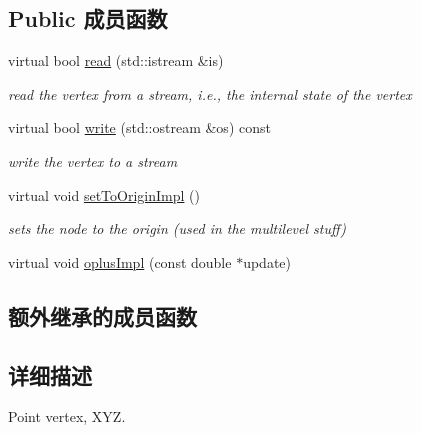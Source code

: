 \subsection*{Public 成员函数}
\begin{DoxyCompactItemize}
\item 
\hypertarget{classg2o_1_1VertexSBAPointXYZ_a3668aa23ed3fc7e2c3e6bddda7ddcd1a}{virtual bool \hyperlink{classg2o_1_1VertexSBAPointXYZ_a3668aa23ed3fc7e2c3e6bddda7ddcd1a}{read} (std\-::istream \&is)}\label{classg2o_1_1VertexSBAPointXYZ_a3668aa23ed3fc7e2c3e6bddda7ddcd1a}

\begin{DoxyCompactList}\small\item\em read the vertex from a stream, i.\-e., the internal state of the vertex \end{DoxyCompactList}\item 
\hypertarget{classg2o_1_1VertexSBAPointXYZ_aa600a1190e1760b5616de4f4e26ca5f8}{virtual bool \hyperlink{classg2o_1_1VertexSBAPointXYZ_aa600a1190e1760b5616de4f4e26ca5f8}{write} (std\-::ostream \&os) const }\label{classg2o_1_1VertexSBAPointXYZ_aa600a1190e1760b5616de4f4e26ca5f8}

\begin{DoxyCompactList}\small\item\em write the vertex to a stream \end{DoxyCompactList}\item 
\hypertarget{classg2o_1_1VertexSBAPointXYZ_a787b72465f35a3f30fcbb6b8056b47c4}{virtual void \hyperlink{classg2o_1_1VertexSBAPointXYZ_a787b72465f35a3f30fcbb6b8056b47c4}{set\-To\-Origin\-Impl} ()}\label{classg2o_1_1VertexSBAPointXYZ_a787b72465f35a3f30fcbb6b8056b47c4}

\begin{DoxyCompactList}\small\item\em sets the node to the origin (used in the multilevel stuff) \end{DoxyCompactList}\item 
virtual void \hyperlink{classg2o_1_1VertexSBAPointXYZ_aa2a13838edc46ed5395fee5c07c4c8ea}{oplus\-Impl} (const double $\ast$update)
\end{DoxyCompactItemize}
\subsection*{额外继承的成员函数}


\subsection{详细描述}
Point vertex, X\-Y\-Z. 

